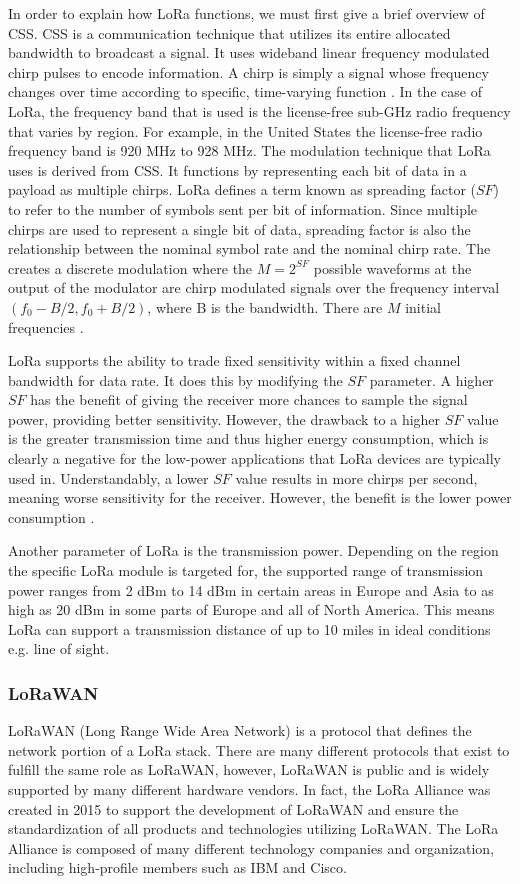 In order to explain how LoRa functions, we must first give a brief overview of CSS. CSS is a communication technique that utilizes its entire allocated bandwidth to broadcast a signal. It uses wideband linear frequency modulated chirp pulses to encode information. A chirp is simply a signal whose frequency changes over time according to specific, time-varying function \cite{ieee-std-chirp}. In the case of LoRa, the frequency band that is used is the license-free sub-GHz radio frequency that varies by region. For example, in the United States the license-free radio frequency band is 920 MHz to 928 MHz. The modulation technique that LoRa uses is derived from CSS. It functions by representing each bit of data in a payload as multiple chirps. LoRa defines a term known as spreading factor ($SF$) to refer to the number of symbols sent per bit of information. Since multiple chirps are used to represent a single bit of data, spreading factor is also the relationship between the nominal symbol rate and the nominal chirp rate. The creates a discrete modulation where the $M=2^{SF}$ possible waveforms at the output of the modulator are chirp modulated signals over the frequency interval $(f_0 - B/2, f_0 + B/2)$, where B is the bandwidth. There are $M$ initial frequencies \cite{ieee-lora-modulation}.

LoRa supports the ability to trade fixed sensitivity within a fixed channel bandwidth for data rate. It does this by modifying the $SF$ parameter. A higher $SF$ has the benefit of giving the receiver more chances to sample the signal power, providing better sensitivity. However, the drawback to a higher $SF$ value is the greater transmission time and thus higher energy consumption, which is clearly a negative for the low-power applications that LoRa devices are typically used in. Understandably, a lower $SF$ value results in more chirps per second, meaning worse sensitivity for the receiver. However, the benefit is the lower power consumption \cite{ttn-spreading-factor}.

Another parameter of LoRa is the transmission power. Depending on the region the specific LoRa module is targeted for, the supported range of transmission power ranges from 2 dBm to 14 dBm in certain areas in Europe and Asia to as high as 20 dBm in some parts of Europe and all of North America. This means LoRa can support a transmission distance of up to 10 miles in ideal conditions e.g. line of sight.

\subsubsection{LoRaWAN}
LoRaWAN (Long Range Wide Area Network) is a protocol that defines the network portion of a LoRa stack. There are many different protocols that exist to fulfill the same role as LoRaWAN, however, LoRaWAN is public and is widely supported by many different hardware vendors. In fact, the LoRa Alliance was created in 2015 to support the development of LoRaWAN and ensure the standardization of all products and technologies utilizing LoRaWAN. The LoRa Alliance is composed of many different technology companies and organization, including high-profile members such as IBM and Cisco.

